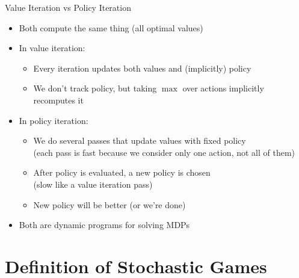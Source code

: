 \documentclass[11pt,aspectratio=169]{beamer}
\begin{document}
  
  \begin{frame}{Value Iteration vs Policy Iteration}
   \begin{itemize}[<+->]
   \setlength{\itemsep}{1em}
    \item Both compute the same thing (all optimal values)
    \item In \alert{value iteration:}
    \begin{itemize}
     \item Every iteration updates both values and (implicitly) policy
     \item We don't track policy, but taking $\max$ over actions implicitly recomputes it
    \end{itemize}
    \item In \alert{policy iteration:}
    \begin{itemize}
     \item We do several passes that update values with fixed policy\\(each pass is fast because we consider only one action, not all of them)
     \item After policy is evaluated, a new policy is chosen\\(slow like a value iteration pass)
     \item New policy will be better (or we're done)
    \end{itemize}
    \item Both are \alert{dynamic programs} for solving MDPs
   \end{itemize}
  \end{frame}
  
  
 \section{Definition of Stochastic Games}
 
\end{document}
